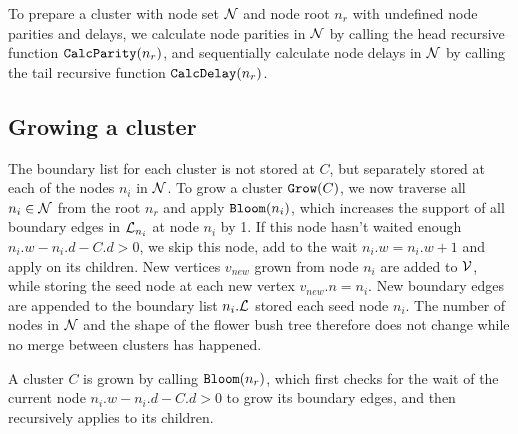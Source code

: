 \begin{theorem}
  To prepare a cluster with node set $\mathcal{N}$ and node root $n_r$ with undefined node parities and delays, we calculate node parities in $\mathcal{N}$ by calling the head recursive function $\texttt{CalcParity}(n_r)$, and sequentially calculate node delays in $\mathcal{N}$ by calling the tail recursive function $\texttt{CalcDelay}(n_r)$.
\end{theorem}


\subsection{Growing a cluster}\label{sec:growingcluster}

The boundary list for each cluster is not stored at $C$, but separately stored at each of the nodes $n_i$ in $\mathcal{N}$. To grow a cluster $\texttt{Grow}(C)$, we now traverse all $n_i \in \mathcal{N}$ from the root $n_r$ and apply $\texttt{Bloom}(n_i)$, which increases the support of all boundary edges in $\mathcal{L}_{n_i}$ at node $n_i$ by 1. If this node hasn't waited enough $n_i.w - n_i.d - C.d > 0$, we skip this node, add to the wait $n_i.w = n_i.w +1$ and apply  on its children. New vertices $v_{new}$ grown from node $n_i$ are added to $\mathcal{V}$, while storing the seed node at each new vertex $v_{new}.n = n_i$. New boundary edges are appended to the boundary list $n_i.\mathcal{L}$ stored each seed node $n_i$. The number of nodes in $\mathcal{N}$ and the shape of the flower bush tree therefore does not change while no merge between clusters has happened.

\begin{theorem}\label{the:grownode}
  A cluster $C$ is grown by calling $\texttt{Bloom}(n_r)$, which first checks for the wait of the current node $n_i.w - n_i.d - C.d> 0$ to grow its boundary edges, and then recursively applies  to its children.
\end{theorem}

\begin{algo}[algotitle=Grow, label=al:bbgrow]
\begin{algorithm}[H]


\KwData{\node}

\BlankLine


\end{algorithm}
\end{algo}



